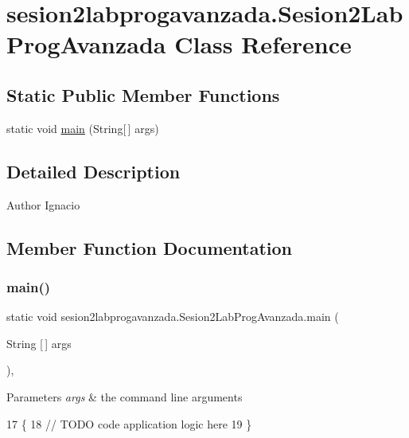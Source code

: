 \hypertarget{classsesion2labprogavanzada_1_1_sesion2_lab_prog_avanzada}{}\section{sesion2labprogavanzada.\+Sesion2\+Lab\+Prog\+Avanzada Class Reference}
\label{classsesion2labprogavanzada_1_1_sesion2_lab_prog_avanzada}
\subsection*{Static Public Member Functions}
\begin{DoxyCompactItemize}
\item 
static void \mbox{\hyperlink{classsesion2labprogavanzada_1_1_sesion2_lab_prog_avanzada_a414657765eda273f83bef3fcf4b1d1fd}{main}} (String\mbox{[}$\,$\mbox{]} args)
\end{DoxyCompactItemize}


\subsection{Detailed Description}
\begin{DoxyAuthor}{Author}
Ignacio 
\end{DoxyAuthor}


\subsection{Member Function Documentation}
\mbox{\label{classsesion2labprogavanzada_1_1_sesion2_lab_prog_avanzada_a414657765eda273f83bef3fcf4b1d1fd}} 
\subsubsection{\texorpdfstring{main()}{main()}}
{\footnotesize\ttfamily static void sesion2labprogavanzada.\+Sesion2\+Lab\+Prog\+Avanzada.\+main (\begin{DoxyParamCaption}\item[{String \mbox{[}$\,$\mbox{]}}]{args }\end{DoxyParamCaption})\hspace{0.3cm}{\ttfamily [inline]}, {\ttfamily [static]}}


\begin{DoxyParams}{Parameters}
{\em args} & the command line arguments \\
\hline
\end{DoxyParams}

\begin{DoxyCode}
17                                            \{
18         \textcolor{comment}{// TODO code application logic here}
19     \}
\end{DoxyCode}
